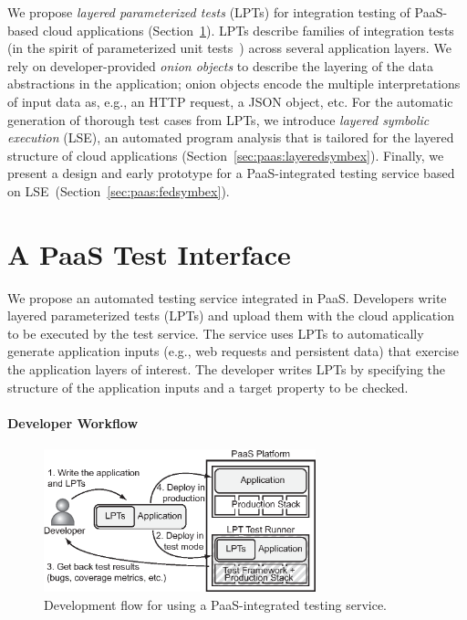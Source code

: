 We propose \textit{layered parameterized tests} (LPTs) for integration testing of PaaS-based cloud applications (Section~\ref{sec:paas:abstractions}). LPTs describe families of integration tests (in the spirit of parameterized unit tests~\cite{tillmann-puts}) across several application layers. We rely on developer-provided \textit{onion objects} to describe the layering of the data abstractions in the application; onion objects encode the multiple interpretations of input data as, e.g., an HTTP request, a JSON object, etc.
%
For the automatic generation of thorough test cases from LPTs, we introduce \emph{layered symbolic execution} (LSE), an automated program analysis that is tailored for the layered structure of cloud applications (Section~\ref{sec:paas:layeredsymbex}).
%
Finally, we present a design and early prototype for a PaaS-integrated testing service based on LSE~(Section~\ref{sec:paas:fedsymbex}).

\section{A PaaS Test Interface}
\label{sec:paas:abstractions}

We propose an automated testing service integrated in PaaS.  Developers write layered parameterized tests (LPTs) and upload them with the cloud application to be executed by the test service.  The service uses LPTs to automatically generate application inputs (e.g., web requests and persistent data) that exercise the application layers of interest.  The developer writes LPTs by specifying the structure of the application inputs and a target property to be checked.

\paragraph{Developer Workflow}

\begin{figure}
  \centering
  \includegraphics[width=3.1in]{paas/figures/developer-flow}
  \caption{Development flow for using a PaaS-integrated testing
    service.}
  \label{fig:development-flow}
\end{figure}

